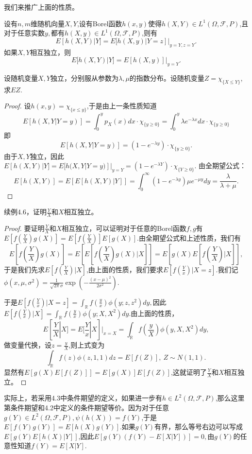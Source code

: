 \documentclass[lang=cn,10pt]{elegantbook}
\begin{document}
	我们来推广上面的性质。
	\begin{proposition}
		设有\(n,m\)维随机向量\(X,Y\),设有Borel函数\(h(x,y)\)使得\(h(X,Y)\in L^1(\Omega,\mathcal{F},P)\),且对于任意实数\(y,\)都有\(h(X,y)\in L^1(\Omega,\mathcal{F},P)\),则有
		\[E[h(X,Y)|Y]=E[h(X,y)|Y=z]|_{y=Y,z=Y}.\]
		如果\(X,Y\)相互独立，则
		\[E[h(X,Y)|Y]=E[h(X,y)]|_{y=Y}.\]
	\end{proposition}
	\begin{example}
		设随机变量\(X,Y\)独立，分别服从参数为\(\lambda,\mu\)的指数分布。设随机变量\(Z=\chi_{\{X\le Y\}}\),求\(EZ\).
	\end{example}
	\begin{proof}
		设\(h(x,y)=\chi_{\{x\le y\}}\),于是由上一条性质知道\[E[h(X,Y|Y=y)]=\int_{0}^{y}p_X(x)dx\cdot \chi_{\{y\ge 0\}}=\int_{0}^{y}\lambda e^{-\lambda x}dx\cdot \chi_{\{y\ge 0\}}\]
		即
		\[E[h(X,Y|Y=y)]=(1-e^{-\lambda y})\cdot \chi_{\{y\ge 0\}}.\]
		由于\(X,Y\)独立，因此\(E[h(X,Y)|Y]=E[h(X,Y|Y=y)]|_{y=Y}=(1-e^{-\lambda Y})\cdot \chi_{\{Y\ge 0\}}.\)
		由全期望公式：
		\[E[h(X,Y)]=E[E[h(X,Y)|Y]]=\int_{0}^{\infty}(1-e^{-\lambda y})\mu e^{-\mu y}dy=\frac{\lambda}{\lambda+\mu}.\]
	\end{proof}
	\begin{example}
		续例4.6，证明\(\frac{Y}{X}\)和\(X\)相互独立。
	\end{example}
	\begin{proof}
		要证明\(\frac{Y}{X}\)和\(X\)相互独立，可以证明对于任意的Borel函数\(f,g\)有\(E[f(\frac{Y}{X})g(X)]=E[f(\frac{Y}{X})]E[g(X)]\).由全期望公式和上述性质，我们有
		\[E[f(\frac{Y}{X})g(X)]=E[E[f(\frac{Y}{X})g(X)|X]]=E[g(X)E[f(\frac{Y}{X})|X]],\]
		于是我们先求\(E[f(\frac{Y}{X})|X]\),由上面的性质，我们要求\(E[f(\frac{Y}{x})|X=z]\).我们记\(\phi(x,\mu,\sigma^2)=\frac{1}{\sqrt{2\pi}\sigma}\exp(-\frac{(x-\mu)^2}{2\sigma^2}).\)
		
		于是\(E[f(\frac{Y}{x})|X=z]=\int_\mathbb{R}f(\frac{y}{x})\phi(y;z,z^2)dy,\)因此\(E[f(\frac{Y}{x})|X]=\int_\mathbb{R}f(\frac{y}{x})\phi(y;X,X^2)dy.\)由上面的性质，
		\[E[\frac{Y}{X}|X]=E[\frac{Y}{x}|X]|_{x=X}=\int_\mathbb{R}f(\frac{y}{X})\phi(y,X,X^2)dy,\]
		做变量代换，设\(z=\frac{y}{X}\),则上式变为
		\[\int_\mathbb{R}f(z)\phi(z,1,1)dz=E[f(Z)],\ Z\sim N(1,1).\]
		显然有\(E[g(X)E[f(Z)]]=E[g(X)]E[f(Z)]\),这就证明了\(\frac{Y}{X}\)和\(X\)相互独立。
	\end{proof}
	实际上，若采用4.3中条件期望的定义，如果进一步有\(h\in L^2(\Omega,\mathcal{F},P)\),那么这里第条件期望和4.2中定义的条件期望等价。因为对于任意\(g(Y)\in L^2(\Omega,\mathcal{F},P),\psi(h(X))=f(Y)\),于是\(E[f(Y)g(Y)]=E[h(X)g(Y)].\)如果\(g(Y)\)有界，那么等号右边可以写成\(E[g(Y)E[h(X)|Y]]\),因此\(E[g(Y)(f(Y)-E[X|Y])]=0,\)由\(g(Y)\)的任意性知道\(f(Y)=E[X|Y]\).
\end{document}
